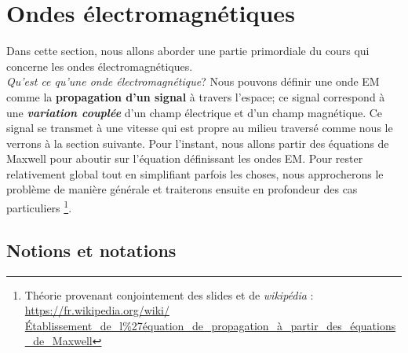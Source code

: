 \chapter{Ondes électromagnétiques}


Dans cette section, nous allons aborder une partie primordiale du cours qui concerne les ondes électromagnétiques. \\
\textit{Qu'est ce qu'une onde électromagnétique}? Nous pouvons définir une onde EM comme la \textbf{propagation d'un signal} à travers l'espace; 
ce signal correspond à une \textbf{\textit{variation couplée}} d'un champ électrique et d'un champ magnétique.  Ce signal se transmet à une vitesse qui est propre au milieu traversé comme nous le verrons à la section suivante. 
Pour l'instant, nous allons partir des équations de Maxwell pour aboutir sur l'équation définissant les ondes EM. Pour rester relativement global tout en simplifiant parfois les choses, nous approcherons le problème de manière générale et traiterons ensuite en profondeur des cas particuliers
\footnote{Théorie provenant conjointement des slides et de \textit{wikipédia} : \url{https://fr.wikipedia.org/wiki/Établissement_de_l\%27équation_de_propagation_à_partir_des_équations_de_Maxwell}}.


\section{Notions et notations}

